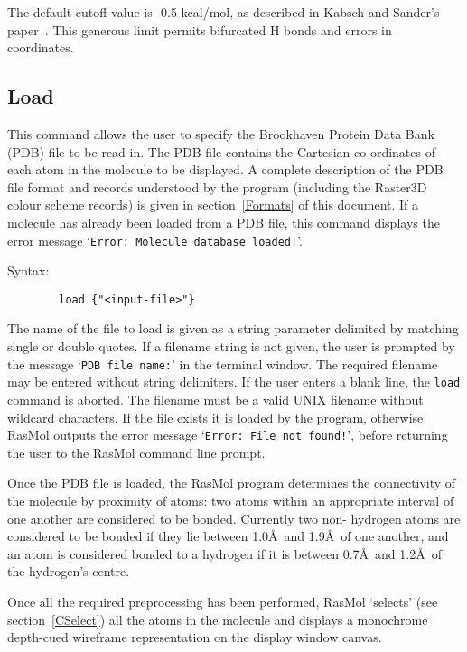 The default cutoff value is -0.5 kcal/mol, as described in Kabsch and 
Sander's paper~\cite{Kabsch83}. This generous limit permits bifurcated H 
bonds and errors in coordinates.  

\subsection{Load}
\label{CLoad}

This command allows the user to specify the Brookhaven Protein Data Bank 
(PDB) file to be read in. The PDB file contains the Cartesian co-ordinates 
of each atom in the molecule to be displayed. A complete description of the 
PDB file format and records understood by the program (including the Raster3D 
colour scheme records) is given in section~\ref{Formats} of this document. If 
a molecule has already been loaded from a PDB file, this command displays the
error message `{\tt Error: Molecule database loaded!}'.

Syntax:
\begin{verbatim}
        load {"<input-file>"}
\end{verbatim}

The name of the file to load is given as a string parameter delimited by
matching single or double quotes. If a filename string is not given, the
user is prompted by the message `{\tt PDB file name:}' in the terminal 
window. The required filename may be entered without string delimiters. 
If the user enters a blank line, the {\tt load} command is aborted. The 
filename must be a valid UNIX filename without wildcard characters. If 
the file exists it is loaded by the program, otherwise RasMol outputs the 
error message `{\tt Error: File not found!}', before returning the user to 
the RasMol command line prompt.

Once the PDB file is loaded, the RasMol program determines the connectivity
of the molecule by proximity of atoms: two atoms within an appropriate
interval of one another are considered to be bonded. Currently two non-%
hydrogen atoms are considered to be bonded if they lie between 1.0\AA\ and
1.9\AA\ of one another, and an atom is considered bonded to a hydrogen if 
it is between 0.7\AA\ and 1.2\AA\ of the hydrogen's centre.


Once all the required preprocessing has been performed, RasMol `selects' 
(see section~\ref{CSelect}) all the atoms in the molecule and displays a 
monochrome depth-cued wireframe representation on the display window canvas. 


